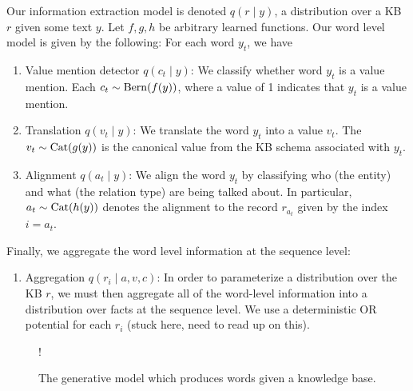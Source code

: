 \documentclass[12pt]{article}
\begin{document}
Our information extraction model is denoted $q(r \mid y)$,
a distribution over a KB $r$ given some text $y$.
Let $f,g,h$ be arbitrary learned functions.
Our word level model is given by the following:
For each word $y_t$, we have
\begin{enumerate}
\item Value mention detector $q(c_t \mid y)$: We classify whether word $y_t$
   is a value mention. Each $c_t \sim \mathrm{Bern}(f(y))$, where a value of 1 indicates
   that $y_t$ is a value mention.
\item Translation $q(v_t \mid y)$: We translate the word $y_t$ into a value $v_t$.
    The $v_t \sim \mathrm{Cat}(g(y))$ is the canonical value from the KB schema 
    associated with $y_t$.
\item Alignment $q(a_t \mid y)$: We align the word $y_t$ by classifying who (the entity)
    and what (the relation type) are being talked about.
    In particular, $a_t\sim\mathrm{Cat}(h(y))$ denotes the alignment to the record $r_{a_t}$
    given by the index $i = a_t$. 
\end{enumerate}

Finally, we aggregate the word level information at the sequence level:
\begin{enumerate}
\item Aggregation $q(r_i \mid a,v,c)$:
    In order to parameterize a distribution over the KB $r$,
    we must then aggregate all of the word-level information into a distribution over
    facts at the sequence level.
    We use a deterministic OR potential for each $r_i$ (stuck here, need to read up on this).
\end{enumerate}

\begin{figure}[t]
\begin{center}
\resizebox {.3\columnwidth} {!} {
} %
\end{center}
\caption{The generative model which produces words given a knowledge base.}
\label{fig:genmodel}
\end{figure}
\end{document}

